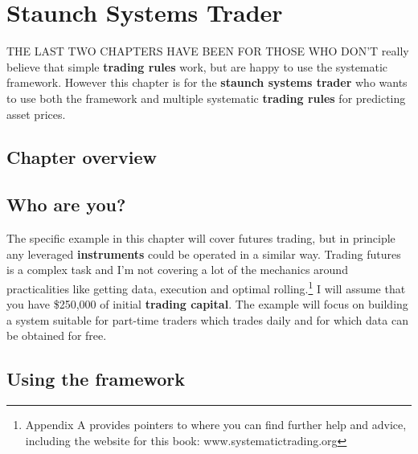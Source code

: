 \chapter{Staunch Systems Trader}

THE LAST TWO CHAPTERS HAVE BEEN FOR THOSE WHO DON'T really believe that simple \textbf{trading rules} work, but are happy to use the systematic framework. However this chapter is for the \textbf{staunch systems trader} who wants to use both the framework and multiple systematic \textbf{trading rules} for predicting asset prices.

\section*{Chapter overview}  {}

\begin{chapteroverviewtable}
\end{chapteroverviewtable}

\section*{Who are you?}  {}

The specific example in this chapter will cover futures trading, but in principle any leveraged \textbf{instruments} could be operated in a similar way. Trading futures is a complex task and I'm not covering a lot of the mechanics around practicalities like getting data, execution and optimal rolling.\footnote{Appendix A provides pointers to where you can find further help and advice, including the website for this book: www.systematictrading.org} I will assume that you have \$250,000 of initial \textbf{trading capital}. The example will focus on building a system suitable for part-time traders which trades daily and for which data can be obtained for free.

\section*{Using the framework}  {}


